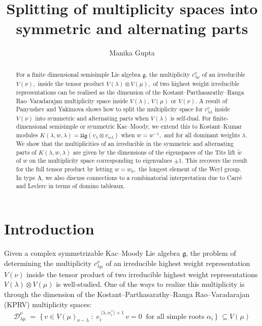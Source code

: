 \documentclass[12pt,reqno]{amsart}
\theoremstyle{plain}
\theoremstyle{definition}
\theoremstyle{plain}
\newcommand{\lie}{\mathfrak}
\newcommand{\lr}{c_{\lambda\mu}^\nu}
\begin{document}
\title{Splitting of multiplicity spaces into symmetric and alternating parts}
\author{Manika Gupta}
\address{The Institute of Mathematical Sciences, Chennai, India}
\address{Homi Bhabha National Institute, Training School Complex, Anushakti Nagar, Mumbai 400094, India}
\maketitle
\begin{abstract}
For a finite dimensional semisimple Lie algebra $\lie{g}$, the multiplicity $\lr$ of an irreducible $V(\nu),$ inside the tensor product $V(\lambda)\otimes V(\mu),$ of two highest weight irreducible representations can be realised as the dimension of the Kostant–Parthasarathy–Ranga Rao–Varadarajan multiplicity space inside $V(\lambda)$, $V(\mu)$ or $V(\nu)$. A result of Panyushev and Yakimova shows how to split the multiplicity space for $c_{\lambda\lambda}^{\nu}$ inside $V(\nu)$ into symmetric and alternating parts when $V(\lambda)$ is self-dual.
For finite-dimensional semisimple or symmetric Kac--Moody, we extend this to Kostant--Kumar modules $K(\lambda,w,\lambda)=\lie{Ug}(v_\lambda\otimes v_{w\lambda})$ when $w=w^{-1},$ and for all dominant weights $\lambda.$ We show that the multiplicities of an irreducible in the symmetric and alternating parts of $K(\lambda,w,\lambda)$ are given by the dimensions of the eigenspaces of the Tits lift $\widetilde w$ of $w$ on the multiplicity space corresponding to eigenvalues $\pm 1$. This recovers the result for the full tensor product by letting $w=w_0,$ the longest element of the Weyl group. In type A, we also discuss connections to a combinatorial interpretation due to Carr\'e and Leclerc in terms of domino tableaux. 
\end{abstract}

\section{Introduction}
Given a complex symmetrizable Kac--Moody Lie algebra $\lie g$, the problem of determining the multiplicity $\lr$ of an irreducible highest weight representation $V(\nu)$ inside the tensor product of two irreducible highest weight representations $V(\lambda)\otimes V(\mu)$ is well-studied. One of the ways to realize this multiplicity is through the dimension of the Kostant–Parthasarathy–Ranga Rao–Varadarajan (KPRV) multiplicity spaces:
$$
    \mathcal{D}_{\lambda\mu}^{\nu} \;=\; \bigl\{\,v\in V(\mu)_{\nu-\lambda}\;:\;
    e_i^{\,\langle\lambda,\alpha_i^\vee\rangle+1}\,v=0\ \text{ for all simple roots } \alpha_i\,\bigr\} \;\subseteq V(\mu)
$$
\end{document}

